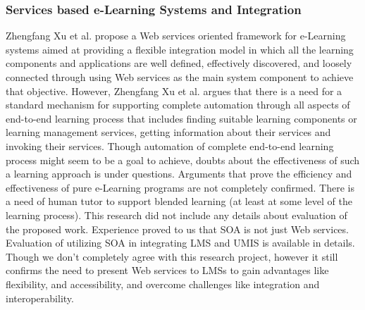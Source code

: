\documentclass[12pt,a4paper,final,twoside,onecolumn,titlepage]{book}
\begin{document}
\subsubsection{Services based e-Learning Systems and Integration}
Zhengfang Xu et al. \cite{R62} propose a Web services oriented framework for e-Learning systems aimed at providing a flexible integration model in which all the learning components and applications are well defined, effectively discovered, and loosely connected through using Web services as the main system component to achieve that objective. However, Zhengfang Xu et al. argues that there is a need for a standard mechanism for supporting complete automation through all aspects of end-to-end learning process that includes finding suitable learning components or learning management services, getting information about their services and invoking their services. Though automation of complete end-to-end learning process might seem to be a goal to achieve, doubts about the effectiveness of such a learning approach is under questions. Arguments that prove the efficiency and effectiveness of pure e-Learning programs are not completely confirmed. There is a need of human tutor to support blended learning (at least at some level of the learning process). This research did not include any details about evaluation of the proposed work. Experience proved to us that \gls{SOA} is not just Web services. Evaluation of utilizing \gls{SOA} in integrating \gls{LMS} and \gls{UMIS} is available in details. Though we don’t completely agree with this research project, however it still confirms the need to present Web services to \gls{LMS}s to gain advantages like flexibility, and accessibility, and overcome challenges like integration and interoperability.
\end{document}
